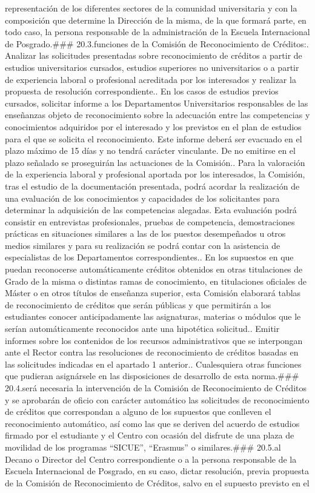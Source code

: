 \documentclass{article}
\begin{document}
\begin{itemize}
representación de los diferentes sectores de la comunidad universitaria y con la composición que determine la Dirección de la misma, de la que formará parte, en todo caso, la persona responsable de la administración de la Escuela Internacional de Posgrado.\n\n### 20.3. funciones de la Comisión de Reconocimiento de Créditos:. Analizar las solicitudes presentadas sobre reconocimiento de créditos a partir de estudios universitarios cursados, estudios superiores no universitarios o a partir de experiencia laboral o profesional acreditada por los interesados y realizar la propuesta de resolución correspondiente.. En los casos de estudios previos cursados, solicitar informe a los Departamentos Universitarios responsables de las enseñanzas objeto de reconocimiento sobre la adecuación entre las competencias y conocimientos adquiridos por el interesado y los previstos en el plan de estudios para el que se solicita el reconocimiento. Este informe deberá ser evacuado en el plazo máximo de 15 días y no tendrá carácter vinculante. De no emitirse en el plazo señalado se proseguirán las actuaciones de la Comisión.. Para la valoración de la experiencia laboral y profesional aportada por los interesados, la Comisión, tras el estudio de la documentación presentada, podrá acordar la realización de una evaluación de los conocimientos y capacidades de los solicitantes para determinar la adquisición de las competencias alegadas. Esta evaluación podrá consistir en entrevistas profesionales, pruebas de competencia, demostraciones prácticas en situaciones similares a las de los puestos desempeñados u otros medios similares y para su realización se podrá contar con la asistencia de especialistas de los Departamentos correspondientes.. En los supuestos en que puedan reconocerse automáticamente créditos obtenidos en otras titulaciones de Grado de la misma o distintas ramas de conocimiento, en titulaciones oficiales de Máster o en otros títulos de enseñanza superior, esta Comisión elaborará tablas de reconocimiento de créditos que serán públicas y que permitirán a los estudiantes conocer anticipadamente las asignaturas, materias o módulos que le serían automáticamente reconocidos ante una hipotética solicitud.. Emitir informes sobre los contenidos de los recursos administrativos que se interpongan ante el Rector contra las resoluciones de reconocimiento de créditos basadas en las solicitudes indicadas en el apartado 1 anterior.. Cualesquiera otras funciones que pudieran asignársele en las disposiciones de desarrollo de esta norma.\n\n### 20.4.\nNo será necesaria la intervención de la Comisión de Reconocimiento de Créditos y se aprobarán de oficio con carácter automático las solicitudes de reconocimiento de créditos que correspondan a alguno de los supuestos que conlleven el reconocimiento automático, así como las que se deriven del acuerdo de estudios firmado por el estudiante y el Centro con ocasión del disfrute de una plaza de movilidad de los programas “SICUE”, “Erasmus” o similares.\n\n### 20.5. al Decano o Director del Centro correspondiente o a la persona responsable de la Escuela Internacional de Posgrado, en su caso, dictar resolución, previa propuesta de la Comisión de Reconocimiento de Créditos, salvo en el supuesto previsto en el 
\end{itemize}
\end{document}
